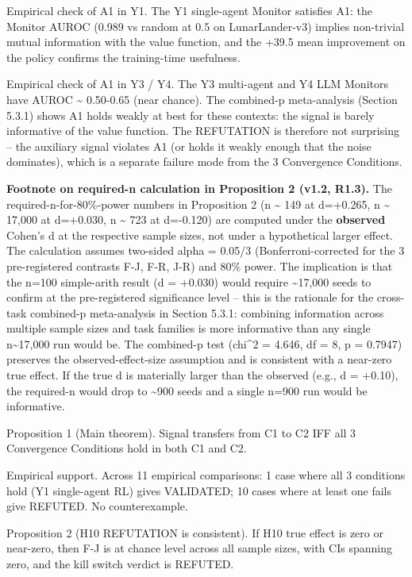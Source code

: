 \documentclass[11pt]{article}
\begin{document}
Empirical check of A1 in Y1. The Y1 single-agent Monitor satisfies A1:
the Monitor AUROC (0.989 vs random at 0.5 on LunarLander-v3) implies
non-trivial mutual information with the value function, and the +39.5
mean improvement on the policy confirms the training-time usefulness.

Empirical check of A1 in Y3 / Y4. The Y3 multi-agent and Y4 LLM Monitors
have AUROC \textasciitilde{} 0.50-0.65 (near chance). The combined-p
meta-analysis (Section 5.3.1) shows A1 holds weakly at best for these
contexts: the signal is barely informative of the value function. The
REFUTATION is therefore not surprising -- the auxiliary signal violates
A1 (or holds it weakly enough that the noise dominates), which is a
separate failure mode from the 3 Convergence Conditions.

\textbf{Footnote on required-n calculation in Proposition 2 (v1.2,
R1.3).} The required-n-for-80\%-power numbers in Proposition 2 (n
\textasciitilde{} 149 at d=+0.265, n \textasciitilde{} 17,000 at
d=+0.030, n \textasciitilde{} 723 at d=-0.120) are computed under the
\textbf{observed} Cohen's d at the respective sample sizes, not under a
hypothetical larger effect. The calculation assumes two-sided alpha =
0.05/3 (Bonferroni-corrected for the 3 pre-registered contrasts F-J,
F-R, J-R) and 80\% power. The implication is that the n=100 simple-arith
result (d = +0.030) would require \textasciitilde17,000 seeds to confirm
at the pre-registered significance level -- this is the rationale for
the cross-task combined-p meta-analysis in Section 5.3.1: combining
information across multiple sample sizes and task families is more
informative than any single n\textasciitilde17,000 run would be. The
combined-p test (chi\^{}2 = 4.646, df = 8, p = 0.7947) preserves the
observed-effect-size assumption and is consistent with a near-zero true
effect. If the true d is materially larger than the observed (e.g., d =
+0.10), the required-n would drop to \textasciitilde900 seeds and a
single n=900 run would be informative.

Proposition 1 (Main theorem). Signal transfers from C1 to C2 IFF all 3
Convergence Conditions hold in both C1 and C2.

Empirical support. Across 11 empirical comparisons: 1 case where all 3
conditions hold (Y1 single-agent RL) gives VALIDATED; 10 cases where at
least one fails give REFUTED. No counterexample.

Proposition 2 (H10 REFUTATION is consistent). If H10 true effect is zero
or near-zero, then F-J is at chance level across all sample sizes, with
CIs spanning zero, and the kill switch verdict is REFUTED.
\end{document}

